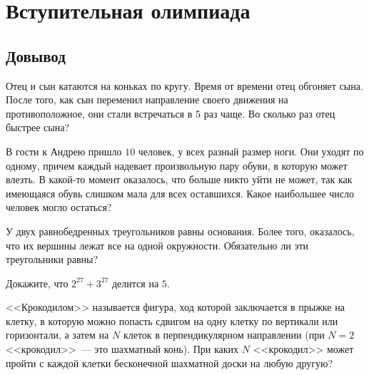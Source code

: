 
\section*{Вступительная олимпиада}



\subsection*{Довывод}

\begin{problems}
	
\item
Отец и сын катаются на коньках по кругу.
Время от времени отец обгоняет сына.
После того, как сын переменил направление своего движения на противоположное,
они стали встречаться в $5$ раз чаще.
Во сколько раз отец быстрее сына?

\item
В гости к Андрею пришло $10$ человек, у всех разный размер ноги.
Они уходят по одному, причем каждый надевает произвольную пару обуви, в которую
может влезть.
В какой-то момент оказалось, что больше никто уйти не может, так как имеющаяся
обувь слишком мала для всех оставшихся.
Какое наибольшее число человек могло остаться?

\item
У двух равнобедренных треугольников равны основания.
Более того, оказалось, что их вершины лежат все на одной окружности.
Обязательно ли эти треугольники равны?

\item
Докажите, что $2^{27} + 3^{27}$ делится на $5$.

\item
<<Крокодилом>> называется фигура, ход которой заключается в прыжке на клетку,
в которую можно попасть сдвигом на одну клетку по вертикали или горизонтали,
а затем на $N$ клеток в перпендикулярном направлении
(при $N = 2$ <<крокодил>>~--- это шахматный конь).
При каких $N$ <<крокодил>> может пройти с каждой клетки бесконечной шахматной
доски на любую другую?

\end{problems}


